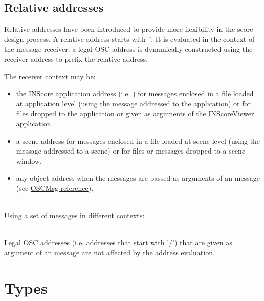 \documentclass[a4paper,twoside]{report}
\newcommand{\sublevel}[1]	{\section{#1}}
\newcommand{\subsublevel}[1]	{\subsection{#1}}
\begin{document}
\subsublevel{Relative addresses}
\label{reladdress}

Relative addresses have been introduced to provide more flexibility in the score design process. A relative address starts with ''. It is evaluated in the context of the message receiver: a legal OSC address is dynamically constructed using the receiver address  to prefix the relative address. 

\example
{}

The receiver context may be:
\begin{itemize}
\item the INScore application address (i.e. ) for messages enclosed in a file loaded at application level (using the  message addressed to the application) or for files dropped to the application or given as arguments of the INScoreViewer application.
\item a scene address for messages enclosed in a file loaded at scene level (using the  message addressed to a scene) or for files or messages dropped to a scene window.
\item any object address when the messages are passed as arguments of an  message (see \href{https://inscoredoc.grame.fr/refs/4-miscmsgs/}{OSCMsg reference}).
\end{itemize}

\example\\
Using a set of messages in different contexts:

\note{}\\
Legal OSC addresses (i.e. addresses that start with '/') that are given as argument of an  message are not affected by the address evaluation.


\sublevel{Types}
\label{scripttypes}
\end{document}
